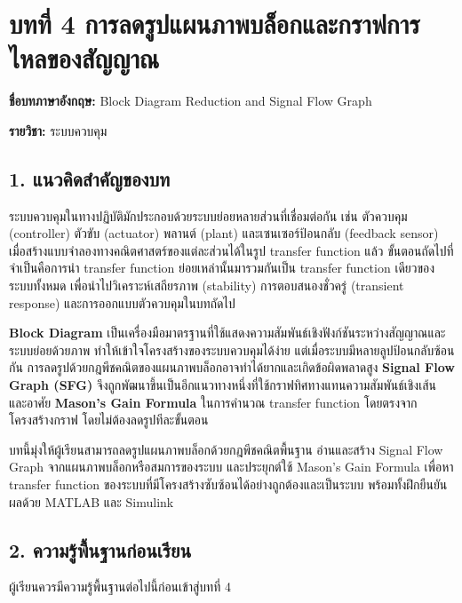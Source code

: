 \section{บทที่ 4 การลดรูปแผนภาพบล็อกและกราฟการไหลของสัญญาณ}

\noindent\textbf{ชื่อบทภาษาอังกฤษ:} Block Diagram Reduction and Signal Flow Graph\par
\noindent\textbf{รายวิชา:} ระบบควบคุม


\subsection{1. แนวคิดสำคัญของบท}

ระบบควบคุมในทางปฏิบัติมักประกอบด้วยระบบย่อยหลายส่วนที่เชื่อมต่อกัน เช่น ตัวควบคุม (controller) ตัวขับ (actuator) พลานต์ (plant) และเซนเซอร์ป้อนกลับ (feedback sensor) เมื่อสร้างแบบจำลองทางคณิตศาสตร์ของแต่ละส่วนได้ในรูป transfer function แล้ว ขั้นตอนถัดไปที่จำเป็นคือการนำ transfer function ย่อยเหล่านั้นมารวมกันเป็น transfer function เดียวของระบบทั้งหมด เพื่อนำไปวิเคราะห์เสถียรภาพ (stability) การตอบสนองชั่วครู่ (transient response) และการออกแบบตัวควบคุมในบทถัดไป

\textbf{Block Diagram} เป็นเครื่องมือมาตรฐานที่ใช้แสดงความสัมพันธ์เชิงฟังก์ชันระหว่างสัญญาณและระบบย่อยด้วยภาพ ทำให้เข้าใจโครงสร้างของระบบควบคุมได้ง่าย แต่เมื่อระบบมีหลายลูปป้อนกลับซ้อนกัน การลดรูปด้วยกฎพีชคณิตของแผนภาพบล็อกอาจทำได้ยากและเกิดข้อผิดพลาดสูง \textbf{Signal Flow Graph (SFG)} จึงถูกพัฒนาขึ้นเป็นอีกแนวทางหนึ่งที่ใช้กราฟทิศทางแทนความสัมพันธ์เชิงเส้น และอาศัย \textbf{Mason's Gain Formula} ในการคำนวณ transfer function โดยตรงจากโครงสร้างกราฟ โดยไม่ต้องลดรูปทีละขั้นตอน

บทนี้มุ่งให้ผู้เรียนสามารถลดรูปแผนภาพบล็อกด้วยกฎพีชคณิตพื้นฐาน อ่านและสร้าง Signal Flow Graph จากแผนภาพบล็อกหรือสมการของระบบ และประยุกต์ใช้ Mason's Gain Formula เพื่อหา transfer function ของระบบที่มีโครงสร้างซับซ้อนได้อย่างถูกต้องและเป็นระบบ พร้อมทั้งฝึกยืนยันผลด้วย MATLAB และ Simulink



\subsection{2. ความรู้พื้นฐานก่อนเรียน}

ผู้เรียนควรมีความรู้พื้นฐานต่อไปนี้ก่อนเข้าสู่บทที่ 4

